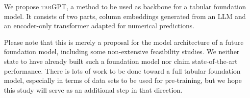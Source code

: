 \documentclass{article}
\begin{document}
We propose \textsc{tabGPT}, a method to be used as backbone for a tabular foundation model. It consists of two parts, column embeddings generated from an LLM and an encoder-only transformer adapted for numerical predictions.

Please note that this is merely a proposal for the model architecture of a future foundation model, including some non-extensive feasibility studies. We neither state to have already built such a foundation model nor claim state-of-the-art performance. There is lots of work to be done toward a full tabular foundation model, especially in terms of data sets to be used for pre-training, but we hope this study will serve as an additional step in that direction.


  
\end{document}
